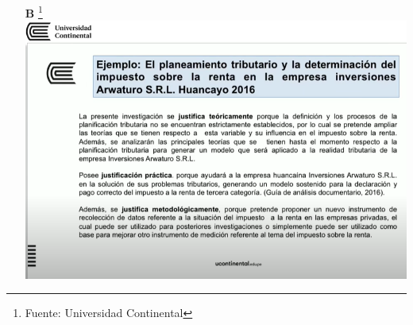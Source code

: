 \begin{itemize}
    
    \item[\textbf{B}] \footnote{Fuente: Universidad Continental}
   \includegraphics[scale=0.8]{img/ejempl2.png}
    
\end{itemize}



